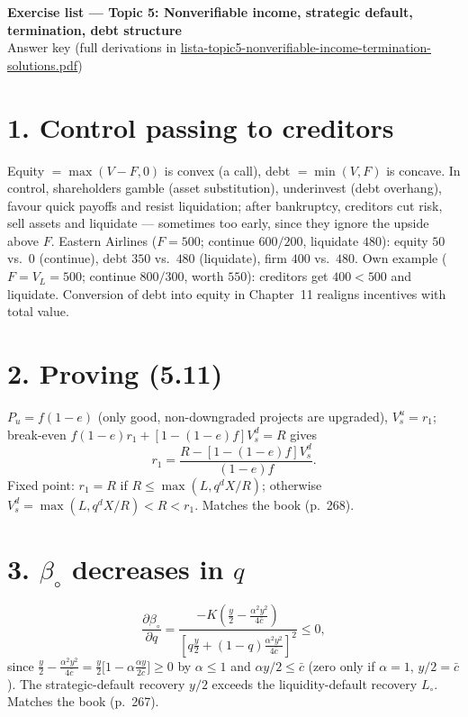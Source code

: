 \documentclass[11pt,a4paper]{article}
\begin{document}
\begin{center}{\Large\bfseries Exercise list --- Topic 5: Nonverifiable income, strategic default, termination, debt structure}\\[4pt]{\large Answer key (full derivations in \url{lista-topic5-nonverifiable-income-termination-solutions.pdf})}\end{center}

\section*{1. Control passing to creditors}
Equity $=\max(V-F,0)$ is convex (a call), debt $=\min(V,F)$ is concave. In control, shareholders
gamble (asset substitution), underinvest (debt overhang), favour quick payoffs and resist
liquidation; after bankruptcy, creditors cut risk, sell assets and liquidate --- sometimes too early,
since they ignore the upside above $F$. Eastern Airlines ($F=500$; continue $600/200$, liquidate $480$):
equity $50$ vs.\ $0$ (continue), debt $350$ vs.\ $480$ (liquidate), firm $400$ vs.\ $480$.
Own example ($F=V_L=500$; continue $800/300$, worth $550$): creditors get $400<500$ and liquidate.
Conversion of debt into equity in Chapter~11 realigns incentives with total value.

\section*{2. Proving (5.11)}
$P_u=f(1-e)$ (only good, non-downgraded projects are upgraded), $V_s^u=r_1$; break-even
$f(1-e)r_1+[1-(1-e)f]V_s^d=R$ gives
$$r_1=\frac{R-[1-(1-e)f]V_s^d}{(1-e)f}.$$
Fixed point: $r_1=R$ if $R\leq\max(L,q^dX/R)$; otherwise $V_s^d=\max(L,q^dX/R)<R<r_1$. Matches the book (p.~268).

\section*{3. $\beta_\circ$ decreases in $q$}
$$\frac{\partial\beta_\circ}{\partial q}=\frac{-K\left(\frac y2-\frac{\alpha^2y^2}{4\bar c}\right)}{\left[q\frac y2+(1-q)\frac{\alpha^2y^2}{4\bar c}\right]^2}\leq0,$$
since $\frac y2-\frac{\alpha^2y^2}{4\bar c}=\frac y2\bigl[1-\alpha\frac{\alpha y}{2\bar c}\bigr]\geq0$ by
$\alpha\leq1$ and $\alpha y/2\leq\bar c$ (zero only if $\alpha=1$, $y/2=\bar c$). The strategic-default
recovery $y/2$ exceeds the liquidity-default recovery $L_\circ$. Matches the book (p.~267).
\end{document}
